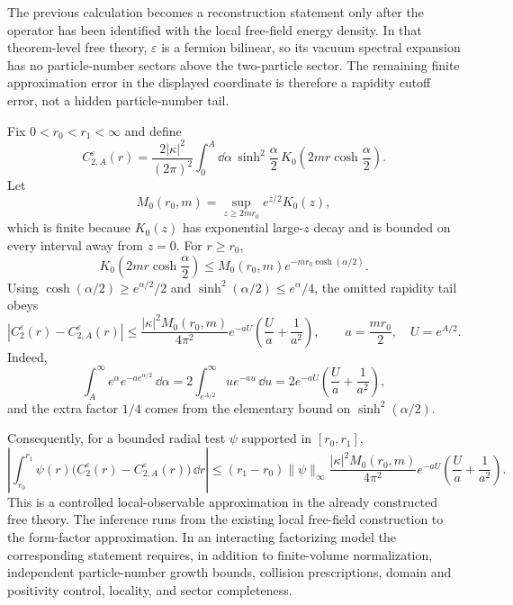 \begin{controlledapproximation}
\label{ca:majorana-energy-separated-window-tail}
The previous calculation becomes a reconstruction statement only after the
operator has been identified with the local free-field energy density.  In
that theorem-level free theory, \(\varepsilon\) is a fermion bilinear, so its
vacuum spectral expansion has no particle-number sectors above the
two-particle sector.  The remaining finite approximation error in the displayed
coordinate is therefore a rapidity cutoff error, not a hidden
particle-number tail.

Fix \(0<r_0<r_1<\infty\) and define
\begin{equation}
  C_{2,A}^\varepsilon(r)
  =
  \frac{2|\kappa|^2}{(2\pi)^2}
  \int_0^A
  \dd\alpha\,
  \sinh^2\frac{\alpha}{2}\,
  K_0\!\left(2mr\cosh\frac{\alpha}{2}\right).
  \label{eq:majorana-energy-rapidity-cut-approximant}
\end{equation}
Let
\[
  M_0(r_0,m)=\sup_{z\ge 2mr_0} e^{z/2}K_0(z),
\]
which is finite because \(K_0(z)\) has exponential large-\(z\) decay and is
bounded on every interval away from \(z=0\).  For \(r\ge r_0\),
\[
  K_0\!\left(2mr\cosh\frac{\alpha}{2}\right)
  \le
  M_0(r_0,m)e^{-mr_0\cosh(\alpha/2)} .
\]
Using
\(\cosh(\alpha/2)\ge e^{\alpha/2}/2\) and
\(\sinh^2(\alpha/2)\le e^\alpha/4\), the omitted rapidity tail obeys
\begin{equation}
  \left|C_2^\varepsilon(r)-C_{2,A}^\varepsilon(r)\right|
  \le
  \frac{|\kappa|^2 M_0(r_0,m)}{4\pi^2}
  e^{-aU}\left(\frac{U}{a}+\frac{1}{a^2}\right),
  \qquad
  a=\frac{mr_0}{2},\quad U=e^{A/2}.
  \label{eq:majorana-energy-rapidity-tail-bound}
\end{equation}
Indeed,
\[
  \int_A^\infty e^\alpha e^{-a e^{\alpha/2}}\,\dd\alpha
  =
  2\int_{e^{A/2}}^\infty u e^{-au}\,\dd u
  =
  2e^{-aU}\left(\frac{U}{a}+\frac{1}{a^2}\right),
\]
and the extra factor \(1/4\) comes from the elementary bound on
\(\sinh^2(\alpha/2)\).

Consequently, for a bounded radial test \(\psi\) supported in
\([r_0,r_1]\),
\[
  \left|
    \int_{r_0}^{r_1}
    \psi(r)\bigl(C_2^\varepsilon(r)-C_{2,A}^\varepsilon(r)\bigr)\,\dd r
  \right|
  \le
  (r_1-r_0)\lVert\psi\rVert_\infty
  \frac{|\kappa|^2 M_0(r_0,m)}{4\pi^2}
  e^{-aU}\left(\frac{U}{a}+\frac{1}{a^2}\right).
\]
This is a controlled local-observable approximation in the already
constructed free theory.  The inference runs from the existing local
free-field construction to the form-factor approximation.  In an interacting
factorizing model the corresponding statement requires, in addition to
finite-volume normalization, independent particle-number growth bounds,
collision prescriptions, domain and positivity control, locality, and sector
completeness.
\end{controlledapproximation}

